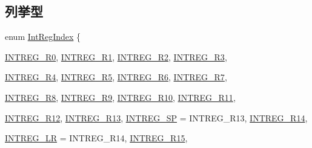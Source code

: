 \subsection*{列挙型}
\begin{DoxyCompactItemize}
\item 
enum \hyperlink{namespaceArmISA_ae64680ba9fb526106829d6bf92fc791b}{IntRegIndex} \{ \par
\hyperlink{namespaceArmISA_ae64680ba9fb526106829d6bf92fc791ba1640917b4a310bb0499a21088b0aab03}{INTREG\_\-R0}, 
\hyperlink{namespaceArmISA_ae64680ba9fb526106829d6bf92fc791ba8340ba42cf2242e4184771ec2f699f7d}{INTREG\_\-R1}, 
\hyperlink{namespaceArmISA_ae64680ba9fb526106829d6bf92fc791baa9669df5d54d9844f2d6da28736949ae}{INTREG\_\-R2}, 
\hyperlink{namespaceArmISA_ae64680ba9fb526106829d6bf92fc791ba65ffc212aaeb9e6652e9928aefce4b34}{INTREG\_\-R3}, 
\par
\hyperlink{namespaceArmISA_ae64680ba9fb526106829d6bf92fc791bab9bebd4761cef699c9dd27f288ea9e37}{INTREG\_\-R4}, 
\hyperlink{namespaceArmISA_ae64680ba9fb526106829d6bf92fc791ba8a1525827ee7334e1f8c5c44875985a2}{INTREG\_\-R5}, 
\hyperlink{namespaceArmISA_ae64680ba9fb526106829d6bf92fc791bad53480277edacec34c8d76e6601b49fe}{INTREG\_\-R6}, 
\hyperlink{namespaceArmISA_ae64680ba9fb526106829d6bf92fc791ba786d8b690a45049b521253b335edc920}{INTREG\_\-R7}, 
\par
\hyperlink{namespaceArmISA_ae64680ba9fb526106829d6bf92fc791bac66ead91eaa60c51e8bcf7dc4f46b7e3}{INTREG\_\-R8}, 
\hyperlink{namespaceArmISA_ae64680ba9fb526106829d6bf92fc791ba6b7438f963c0cddddde957e390088176}{INTREG\_\-R9}, 
\hyperlink{namespaceArmISA_ae64680ba9fb526106829d6bf92fc791ba489c2c86a1504ec742e05de9ff5216af}{INTREG\_\-R10}, 
\hyperlink{namespaceArmISA_ae64680ba9fb526106829d6bf92fc791ba5cc72dc30c42d05c70ebca70910f10c7}{INTREG\_\-R11}, 
\par
\hyperlink{namespaceArmISA_ae64680ba9fb526106829d6bf92fc791ba3f5e7c969c847f91714c4f59511ec1c2}{INTREG\_\-R12}, 
\hyperlink{namespaceArmISA_ae64680ba9fb526106829d6bf92fc791ba9b643bc501a3698ba3902de5901bf8df}{INTREG\_\-R13}, 
\hyperlink{namespaceArmISA_ae64680ba9fb526106829d6bf92fc791ba98baa4d1d280a111eaff2a048e29a70b}{INTREG\_\-SP} =  INTREG\_\-R13, 
\hyperlink{namespaceArmISA_ae64680ba9fb526106829d6bf92fc791ba855a4065d4c4458df72f004fc6eeda4e}{INTREG\_\-R14}, 
\par
\hyperlink{namespaceArmISA_ae64680ba9fb526106829d6bf92fc791ba16ad869dde5202f3570c4f6b7fe33440}{INTREG\_\-LR} =  INTREG\_\-R14, 
\hyperlink{namespaceArmISA_ae64680ba9fb526106829d6bf92fc791ba4fa3cdf8f8860fe4fc62ea7a6669ef85}{INTREG\_\-R15}, 

\end{DoxyCompactItemize}

